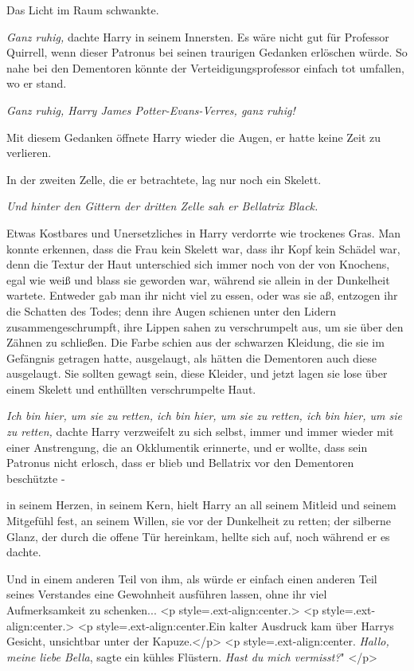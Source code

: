 Das Licht im Raum schwankte.

\emph{Ganz ruhig,} dachte Harry in seinem Innersten. Es wäre nicht gut für
Professor Quirrell, wenn dieser Patronus bei seinen traurigen Gedanken erlöschen
würde. So nahe bei den Dementoren könnte der Verteidigungsprofessor einfach tot
umfallen, wo er stand.

\emph{Ganz ruhig, Harry James Potter-Evans-Verres, ganz ruhig!}

Mit diesem Gedanken öffnete Harry wieder die Augen, er hatte keine Zeit zu
verlieren.

In der zweiten Zelle, die er betrachtete, lag nur noch ein Skelett.

\emph{Und hinter den Gittern der dritten Zelle sah er Bellatrix Black. }

Etwas Kostbares und Unersetzliches in Harry verdorrte wie trockenes Gras. Man
konnte erkennen, dass die Frau kein Skelett war, dass ihr Kopf kein Schädel war,
denn die Textur der Haut unterschied sich immer noch von der von Knochens, egal
wie weiß und blass sie geworden war, während sie allein in der Dunkelheit
wartete. Entweder gab man ihr nicht viel zu essen, oder was sie aß, entzogen ihr
die Schatten des Todes; denn ihre Augen schienen unter den Lidern
zusammengeschrumpft, ihre Lippen sahen zu verschrumpelt aus, um sie über den
Zähnen zu schließen. Die Farbe schien aus der schwarzen Kleidung, die sie im
Gefängnis getragen hatte, ausgelaugt, als hätten die Dementoren auch diese
ausgelaugt. Sie sollten gewagt sein, diese Kleider, und jetzt lagen sie lose
über einem Skelett und enthüllten verschrumpelte Haut.

\emph{Ich bin hier, um sie zu retten, ich bin hier, um sie zu retten, ich bin
hier, um sie zu retten,} dachte Harry verzweifelt zu sich selbst, immer und
immer wieder mit einer Anstrengung, die an Okklumentik erinnerte, und er wollte,
dass sein Patronus nicht erlosch, dass er blieb und Bellatrix vor den Dementoren
beschützte -

in seinem Herzen, in seinem Kern, hielt Harry an all seinem Mitleid und seinem
Mitgefühl fest, an seinem Willen, sie vor der Dunkelheit zu retten; der silberne
Glanz, der durch die offene Tür hereinkam, hellte sich auf, noch während er es
dachte.

Und in einem anderen Teil von ihm, als würde er einfach einen anderen Teil
seines Verstandes eine Gewohnheit ausführen lassen, ohne ihr viel Aufmerksamkeit
zu schenken... <p style=\grqq{}.ext-align:center\grqq{}.> <p
style=\grqq{}.ext-align:center\grqq{}.> <p
style=\grqq{}.ext-align:center\grqq{}.Ein kalter Ausdruck kam über Harrys
Gesicht, unsichtbar unter der Kapuze.</p> <p
style=\grqq{}.ext-align:center\grqq{}. \glqq \emph{Hallo, meine liebe
Bella}\grqq{}, sagte ein kühles Flüstern. \glqq \emph{Hast du mich vermisst?}"
</p>

